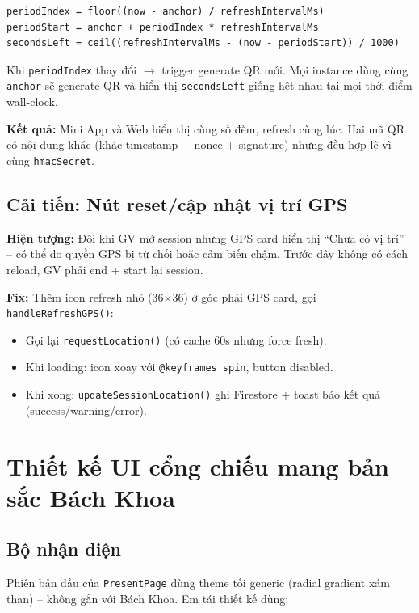 \documentclass{article}
\begin{document}
\begin{verbatim}
periodIndex = floor((now - anchor) / refreshIntervalMs)
periodStart = anchor + periodIndex * refreshIntervalMs
secondsLeft = ceil((refreshIntervalMs - (now - periodStart)) / 1000)
\end{verbatim}

Khi \texttt{periodIndex} thay đổi $\to$ trigger generate QR mới. Mọi instance dùng cùng \texttt{anchor} sẽ generate QR và hiển thị \texttt{secondsLeft} giống hệt nhau tại mọi thời điểm wall-clock.

\textbf{Kết quả:} Mini App và Web hiển thị cùng số đếm, refresh cùng lúc. Hai mã QR có nội dung khác (khác timestamp + nonce + signature) nhưng đều hợp lệ vì cùng \texttt{hmacSecret}.

\subsection{Cải tiến: Nút reset/cập nhật vị trí GPS}

\textbf{Hiện tượng:} Đôi khi GV mở session nhưng GPS card hiển thị ``Chưa có vị trí'' -- có thể do quyền GPS bị từ chối hoặc cảm biến chậm. Trước đây không có cách reload, GV phải end + start lại session.

\textbf{Fix:} Thêm icon refresh nhỏ (36$\times$36) ở góc phải GPS card, gọi \texttt{handleRefreshGPS()}:

\begin{itemize}[leftmargin=1.5em]
  \item Gọi lại \texttt{requestLocation()} (có cache 60s nhưng force fresh).
  \item Khi loading: icon xoay với \texttt{@keyframes spin}, button disabled.
  \item Khi xong: \texttt{updateSessionLocation()} ghi Firestore + toast báo kết quả (success/warning/error).
\end{itemize}

\section{Thiết kế UI cổng chiếu mang bản sắc Bách Khoa}

\subsection{Bộ nhận diện}

Phiên bản đầu của \texttt{PresentPage} dùng theme tối generic (radial gradient xám than) -- không gắn với Bách Khoa. Em tái thiết kế dùng:
\end{document}
